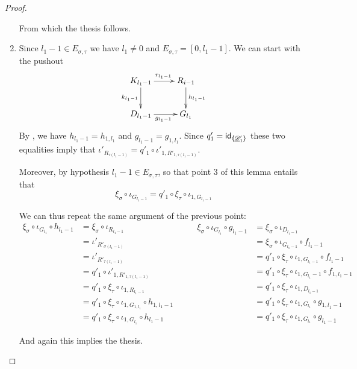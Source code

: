 \begin{proof}
\begin{enumerate}
	From which the thesis follows.
	
			\item Since $l_1-1\in E_{\sigma, \tau}$ we have $l_1\neq 0$ and $E_{\sigma, \tau}=[0,l_1-1]$.  We can start with the pushout
			\[\xymatrix{K_{l_1-1}\ar[r]^{r_{l_1-1}} \ar[d]_{k_{l_1-1}}& R_{i-1} \ar[d]^{h_{l_1-1}}\\ D_{l_1-1} \ar[r]_{g_{l_1-1}}& G_{l_1}}\] 
			By , we have $h_{l_1-1}=h_{1, l_1}$ and $g_{l_1-1}=g_{1,l_1}$. Since $q'_1=\mathsf{id}_{\langle \hspace{-1.85pt}[ \underline{\mathscr{D}}'_1]\hspace{-1.85pt}\rangle}$ these two equalities imply that $	\iota'_{R_{\tau(l_1-1)}}=q'_1\circ \iota'_{1, R'_{1,\tau(l_1-1)}}$. 			
			
			Moreover, by hypothesis $l_1-1\in E_{\sigma, \tau}$, so that point $3$ of this lemma entails that
			\[\xi_\sigma \circ \iota_{G_{l_1-1}}=q'_1 \circ \xi_{\tau} \circ \iota_{1, G_{l_1-1}}\]
			
			We can thus repeat the same argument of the previous point:
			\[\begin{split}
				\xi_\sigma \circ \iota_{G_{l_1}}\circ h_{l_1-1}&=  \xi_\sigma\circ \iota_{R_{l_1-1}}\\&=\iota'_{R'_{\sigma(l_1-1)}}\\&=\iota'_{R'_{\tau(l_1-1)}}\\&=q'_1\circ \iota'_{1, R'_{1,\tau(l_1-1)}}\\&=q'_1\circ \xi_{\tau}\circ \iota_{1, R_{l_1-1}}\\&=q'_1\circ \xi_{\tau} \circ \iota_{1, G_{1,l_1}}\circ h_{1, l_1-1}\\&=q'_1\circ \xi_\tau \circ \iota_{1, G_{l_1}} \circ h_{l_1-1}			\end{split} 
			\qquad  \begin{split}
				\xi_\sigma \circ \iota_{G_{l_1}}\circ g_{l_1-1}&=\xi_{\sigma}\circ \iota_{D_{l_1-1}}\\&=\xi_{\sigma}\circ \iota_{G_{l_1-1}} \circ f_{l_1-1}\\&=q'_1 \circ \xi_{\tau} \circ \iota_{1, G_{l_1-1}} \circ f_{l_1-1}\\&=q'_1 \circ \xi_{\tau} \circ \iota_{1, G_{l_1}-1} \circ f_{1, l_1-1}\\&=q'_1 \circ \xi_{\tau} \circ \iota_{1, D_{l_1-1}}\\&=q'_1 \circ \xi_{\tau} \circ \iota_{1, G_{l_1}}\circ g_{1, l_1-1}\\&=q'_1 \circ \xi_{\tau} \circ \iota_{1, G_{l_1}}\circ g_{l_1-1}
			\end{split}\]
		
		And again this implies the thesis.
			

\end{enumerate}
\end{proof}
